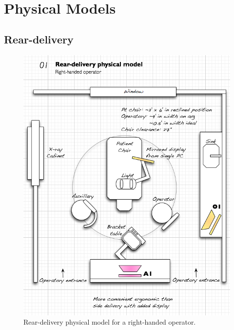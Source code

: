 \documentclass[11pt]{article}
\begin{document}
\section{Physical Models}
\label{physical}
\subsection{Rear-delivery}

\begin{figure}[h!t]
\begin{center}
\includegraphics[width=\textwidth]{phymodel1.png}
\end{center}
\caption{Rear-delivery physical model for a right-handed operator.}
\end{figure}
\end{document}
